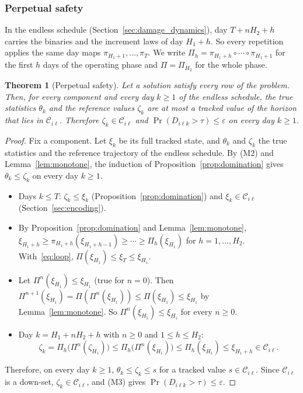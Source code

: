 \documentclass[11pt,a4paper]{article}
\theoremstyle{plain}
\newtheorem{theorem}{Theorem}[section]
\theoremstyle{definition}
\theoremstyle{remark}
\begin{document}
\subsubsection{Perpetual safety}
\label{sec:perpetual}

In the endless schedule (Section~\ref{sec:damage_dynamics}), day $T + nH_2 + h$ carries the binaries and the increment laws of day $H_1 + h$.
So every repetition applies the same day maps $\pi_{H_1+1}, \ldots, \pi_T$.
We write $\Pi_h = \pi_{H_1+h} \circ \cdots \circ \pi_{H_1+1}$ for the first $h$ days of the operating phase and $\Pi = \Pi_{H_2}$ for the whole phase.

\begin{theorem}[Perpetual safety]\label{thm:perpetual}
Let a solution satisfy every row of the problem.
Then, for every component and every day $k \ge 1$ of the endless schedule, the true statistics $\theta_k$ and the reference values $\zeta_k$ are at most a tracked value of the horizon that lies in $\mathcal{C}_{i\ell}$.
Therefore $\zeta_k \in \mathcal{C}_{i\ell}$ and $\Pr(D_{i\ell k} > \tau) \le \varepsilon$ on every day $k \ge 1$.
\end{theorem}
\begin{proof}
Fix a component.
Let $\xi_k$ be its full tracked state, and $\theta_k$ and $\zeta_k$ the true statistics and the reference trajectory of the endless schedule.
By (M2) and Lemma~\ref{lem:monotone}, the induction of Proposition~\ref{prop:domination} gives $\theta_k \le \zeta_k$ on every day $k \ge 1$.
\begin{itemize}[nosep]
  \item Days $k \le T$: $\zeta_k \le \xi_k$ (Proposition~\ref{prop:domination}) and $\xi_k \in \mathcal{C}_{i\ell}$ (Section~\ref{sec:encoding}).
  \item By Proposition~\ref{prop:domination} and Lemma~\ref{lem:monotone}, $\xi_{H_1+h} \ge \pi_{H_1+h}(\xi_{H_1+h-1}) \ge \cdots \ge \Pi_h(\xi_{H_1})$ for $h = 1, \ldots, H_2$.
    With~\eqref{eq:loop}, $\Pi(\xi_{H_1}) \le \xi_T \le \xi_{H_1}$.
  \item Let $\Pi^n(\xi_{H_1}) \le \xi_{H_1}$ (true for $n = 0$).
    Then $\Pi^{n+1}(\xi_{H_1}) = \Pi(\Pi^n(\xi_{H_1})) \le \Pi(\xi_{H_1}) \le \xi_{H_1}$ by Lemma~\ref{lem:monotone}.
    So $\Pi^n(\xi_{H_1}) \le \xi_{H_1}$ for every $n \ge 0$.
  \item Day $k = H_1 + n H_2 + h$ with $n \ge 0$ and $1 \le h \le H_2$:
    \[
      \zeta_k = \Pi_h\bigl(\Pi^n(\zeta_{H_1})\bigr)
      \le \Pi_h\bigl(\Pi^n(\xi_{H_1})\bigr)
      \le \Pi_h(\xi_{H_1})
      \le \xi_{H_1+h} \in \mathcal{C}_{i\ell}.
    \]
\end{itemize}
Therefore, on every day $k \ge 1$, $\theta_k \le \zeta_k \le s$ for a tracked value $s \in \mathcal{C}_{i\ell}$.
Since $\mathcal{C}_{i\ell}$ is a down-set, $\zeta_k \in \mathcal{C}_{i\ell}$, and (M3) gives $\Pr(D_{i\ell k} > \tau) \le \varepsilon$.
\end{proof}
\end{document}
